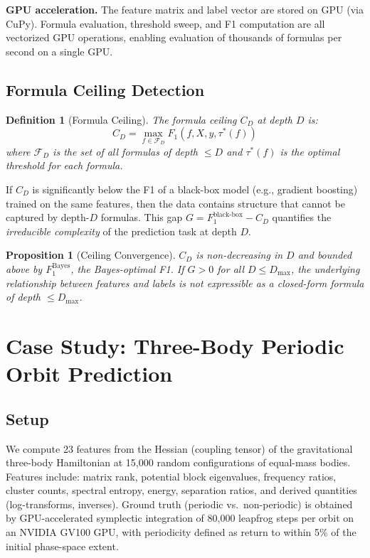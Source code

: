 \documentclass[11pt,a4paper]{article}
\newtheorem{definition}{Definition}
\newtheorem{proposition}{Proposition}
\begin{document}
\textbf{GPU acceleration.} The feature matrix and label vector are
stored on GPU (via CuPy). Formula evaluation, threshold sweep, and
F1 computation are all vectorized GPU operations, enabling evaluation
of thousands of formulas per second on a single GPU.

\subsection{Formula Ceiling Detection}

\begin{definition}[Formula Ceiling]
The \emph{formula ceiling} $C_D$ at depth $D$ is:
\[
C_D = \max_{f \in \mathcal{F}_D} F_1(f, X, y, \tau^*(f))
\]
where $\mathcal{F}_D$ is the set of all formulas of depth $\leq D$
and $\tau^*(f)$ is the optimal threshold for each formula.
\end{definition}

If $C_D$ is significantly below the F1 of a black-box model (e.g.,
gradient boosting) trained on the same features, then the data
contains structure that cannot be captured by depth-$D$ formulas.
This gap $G = F_1^{\mathrm{black\text{-}box}} - C_D$ quantifies
the \emph{irreducible complexity} of the prediction task at depth $D$.

\begin{proposition}[Ceiling Convergence]
$C_D$ is non-decreasing in $D$ and bounded above by
$F_1^{\mathrm{Bayes}}$, the Bayes-optimal F1. If $G > 0$ for all
$D \leq D_{\max}$, the underlying relationship between features and
labels is not expressible as a closed-form formula of depth
$\leq D_{\max}$.
\end{proposition}

\section{Case Study: Three-Body Periodic Orbit Prediction}

\subsection{Setup}

We compute 23 features from the Hessian (coupling tensor) of the
gravitational three-body Hamiltonian at 15,000 random configurations
of equal-mass bodies. Features include: matrix rank, potential block
eigenvalues, frequency ratios, cluster counts, spectral entropy,
energy, separation ratios, and derived quantities (log-transforms,
inverses). Ground truth (periodic vs.\ non-periodic) is obtained by
GPU-accelerated symplectic integration of 80,000 leapfrog steps
per orbit on an NVIDIA GV100 GPU, with periodicity defined as return
to within 5\% of the initial phase-space extent.
\end{document}
